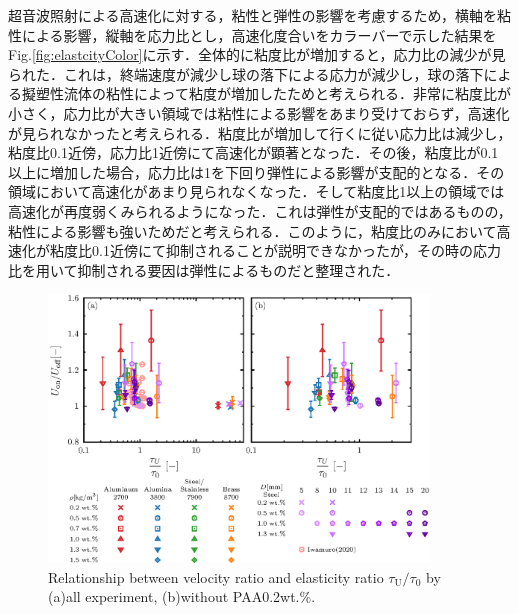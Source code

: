 超音波照射による高速化に対する，粘性と弾性の影響を考慮するため，横軸を粘性による影響，縦軸を応力比とし，高速化度合いをカラーバーで示した結果をFig.\ref{fig:elastcityColor}に示す．全体的に粘度比が増加すると，応力比の減少が見られた．これは，終端速度が減少し球の落下による応力が減少し，球の落下による擬塑性流体の粘性によって粘度が増加したためと考えられる．非常に粘度比が小さく，応力比が大きい領域では粘性による影響をあまり受けておらず，高速化が見られなかったと考えられる．粘度比が増加して行くに従い応力比は減少し，粘度比0.1近傍，応力比1近傍にて高速化が顕著となった．その後，粘度比が0.1以上に増加した場合，応力比は1を下回り弾性による影響が支配的となる．その領域において高速化があまり見られなくなった．そして粘度比1以上の領域では高速化が再度弱くみられるようになった．これは弾性が支配的ではあるものの，粘性による影響も強いためだと考えられる．このように，粘度比のみにおいて高速化が粘度比0.1近傍にて抑制されることが説明できなかったが，その時の応力比を用いて抑制される要因は弾性によるものだと整理された．

\begin{figure}[h]
    \centering
    \includegraphics[width=0.9\textwidth]{5-Results/elastcity.eps}
    \caption{Relationship between velocity ratio and elasticity ratio $\tau_\text{U}/\tau_\text{0}$ by (a)all experiment, (b)without PAA0.2wt.\%.}
    \label{fig:elastcity}
\end{figure}

